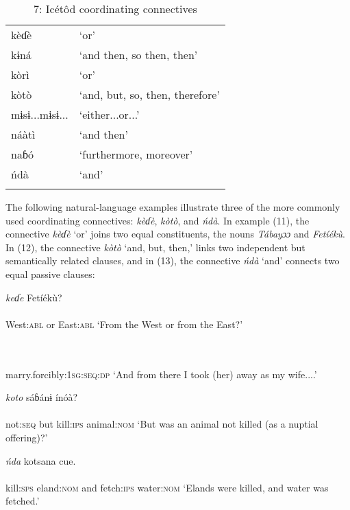 \begin{table}
\caption{7: Icétôd coordinating connectives}
\label{tab:3}


\begin{tabularx}{\textwidth}{XX}
\lsptoprule

kèɗè & ‘or’\\
kɨná & ‘and then, so then, then’\\
kòrì & ‘or’\\
kòtò & ‘and, but, so, then, therefore’\\
mɨsɨ...mɨsɨ... & ‘either...or...’\\
náàtì & ‘and then’\\
naɓó & ‘furthermore, moreover’\\
ńdà & ‘and’\\
\lspbottomrule
\end{tabularx}
\end{table}
The following natural-language examples illustrate three of the more commonly used coordinating connectives: \textit{kèɗè}, \textit{kòtò}, and \textit{ńdà}. In example (11), the connective \textit{kèɗè} ‘or’ joins two equal constituents, the nouns \textit{Tábayɔɔ} and \textit{Fetíékù}. In (12), the connective \textit{kòtò} ‘and, but, then,’ links two independent but semantically related clauses, and in (13), the connective \textit{ńdà} ‘and’ connects two equal passive clauses:




\ea\label{ex:}
   \textit{keɗe}   Fetíékù? \\
    \\
West:\textsc{abl}   or   East:\textsc{abl}
\glt ‘From the West or from the East?’ 
\z



\ea\label{ex:}
  \\
    \\
marry.forcibly:\textsc{1sg:seq:dp}
\glt ‘And from there I took (her) away as my wife....’ 
\z

\ea\label{ex:}
     \textit{koto}   sáɓánɨ   ínóà? \\
    \\
not:\textsc{seq}   but   kill:\textsc{ips}   animal:\textsc{nom}
\glt ‘But was an animal not killed (as a nuptial offering)?’ 
\z



\ea\label{ex:}
   \textit{ńda}   kotsana   cue. \\
    \\
kill:\textsc{sps}  eland:\textsc{nom}   and   fetch:\textsc{ips} water:\textsc{nom}
\glt ‘Elands were killed, and water was fetched.’ 
\z

